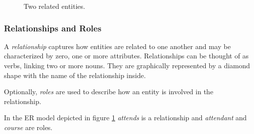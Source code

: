 \begin{figure}[htbp]
\begin{center}
\end{center}
\caption[Simple ER-Model]{Two related entities.}
\label{fig_er_model}
\end{figure}




\subsubsection{Relationships and Roles}

A \emph{relationship} captures how entities are related to one another and may be characterized by zero, one or more attributes. Relationships can be thought of as verbs, linking two or more nouns. They are graphically represented by a diamond shape with the name of the relationship inside.

Optionally, \emph{roles} are used to describe how an entity is involved in the relationship.

\begin{example}
In the ER model depicted in figure \ref{fig_er_model} \textit{attends} is a relationship and \textit{attendant} and \textit{course} are roles.
\end{example}




